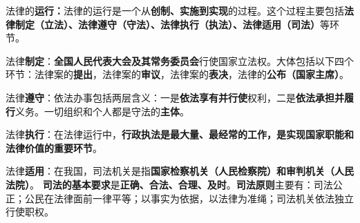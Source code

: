 法律的\textbf{运行：}法律的运行是一个从\textbf{创制、实施到实现}的过程。这个过程主要包括\textbf{法律制定（立法）、法律遵守（守法）、法律执行（执法）、法律适用（司法）}等环节。{}

法律\textbf{制定}：{\textbf{全国人民代表大会及其常务委员会}}行使国家立法权。大体包括以下四个环节：法律案的\textbf{提出}，法律案的\textbf{审议}，法律案的\textbf{表决}，法律的\textbf{公布（国家主席）}。{}

法律\textbf{遵守}：依法办事包括两层含义：一是\textbf{依法享有并行使}权利，二是\textbf{依法承担并履行}义务。一切组织和个人都是守法的\textbf{主体}。{}

法律\textbf{执行}：在法律运行中，{\textbf{行政执法}}\textbf{是最大量、最经常的工作，是实现国家职能和法律价值的重要环节}。

法律\textbf{适用}{：在我国，}司法机关是指\textbf{国家检察机关（人民检察院）和审判机关（人民法院）}{。
}\textbf{{司法的基本}{要求}}{}{}{}{}是\textbf{正确、合法、合理、及时}{。}\textbf{{司法原则}}{主要有：}司法公正；公民在法律面前一律平等；以事实为依据，以法律为准绳；司法机关依法独立行使职权{。}
